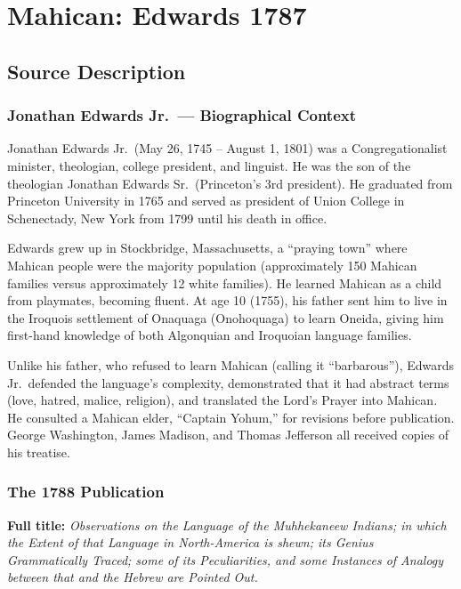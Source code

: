 
\section{Mahican: Edwards 1787}
\label{sec:1369}

\subsection{Source Description}

\subsubsection{Jonathan Edwards Jr.\ --- Biographical Context}

Jonathan Edwards Jr.\ (May 26, 1745 -- August 1, 1801) was a
Congregationalist minister, theologian, college president, and linguist. He
was the son of the theologian Jonathan Edwards Sr.\ (Princeton's 3rd
president). He graduated from Princeton University in 1765 and served as
president of Union College in Schenectady, New York from 1799 until his death
in office.

Edwards grew up in Stockbridge, Massachusetts, a ``praying town'' where
Mahican people were the majority population (approximately 150 Mahican
families versus approximately 12 white families). He learned Mahican as a
child from playmates, becoming fluent. At age 10 (1755), his father sent him
to live in the Iroquois settlement of Onaquaga (Onohoquaga) to learn Oneida,
giving him first-hand knowledge of both Algonquian and Iroquoian language
families.

Unlike his father, who refused to learn Mahican (calling it ``barbarous''),
Edwards Jr.\ defended the language's complexity, demonstrated that it had
abstract terms (love, hatred, malice, religion), and translated the Lord's
Prayer into Mahican. He consulted a Mahican elder, ``Captain Yohum,'' for
revisions before publication. George Washington, James Madison, and Thomas
Jefferson all received copies of his treatise.

\subsubsection{The 1788 Publication}

\textbf{Full title:} \emph{Observations on the Language of the Muhhekaneew
Indians; in which the Extent of that Language in North-America is shewn; its
Genius Grammatically Traced; some of its Peculiarities, and some Instances
of Analogy between that and the Hebrew are Pointed Out.}

